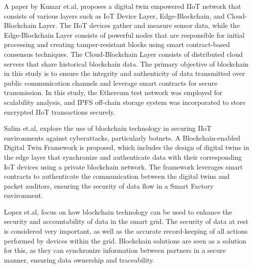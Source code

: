 A paper by Kumar et.al\cite{kumarBlockchainDeepLearning2022}, proposes a digital twin empowered IIoT network that consists of various layers such as IoT Device Layer, Edge-Blockchain, and Cloud-Blockchain Layer. The IIoT devices gather and measure sensor data, while the Edge-Blockchain Layer consists of powerful nodes that are responsible for initial processing and creating tamper-resistant blocks using smart contract-based consensus techniques. The Cloud-Blockchain Layer consists of distributed cloud servers that share historical blockchain data. The primary objective of blockchain in this study is to ensure the integrity and authenticity of data transmitted over public communication channels and leverage smart contracts for secure transmission. In this study, the Ethereum test network was employed for scalability analysis, and IPFS off-chain storage system was incorporated to store encrypted IIoT transactions securely.  

Salim et.al\cite{salimBlockchainEnabledSecureDigital2022}, explore the use of blockchain technology in securing IIoT environments against cyberattacks, particularly botnets. A Blockchain-enabled Digital Twin Framework is proposed, which includes the design of digital twins in the edge layer that synchronize and authenticate data with their corresponding IoT devices using a private blockchain network. The framework leverages smart contracts to authenticate the communication between the digital twins and packet auditors, ensuring the security of data flow in a Smart Factory environment.  

Lopez et.al\cite{lopezDIGITALTWINSINTELLIGENT2021}, focus on how blockchain technology can be used to enhance the security and accountability of data in the smart grid. The security of data at rest is considered very important, as well as the accurate record-keeping of all actions performed by devices within the grid. Blockchain solutions are seen as a solution for this, as they can synchronize information between partners in a secure manner, ensuring data ownership and traceability.  

